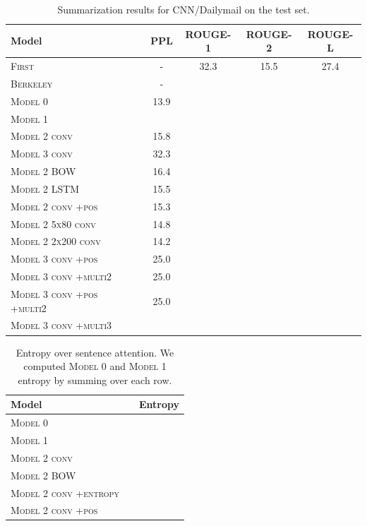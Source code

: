 \documentclass[12pt]{report}
\begin{document}
\begin{table}[h]
\centering
\begin{tabular}{llcccc}
 \toprule
 Model &  & PPL & ROUGE-1 & ROUGE-2 & ROUGE-L \\
 \midrule
\textsc{First} & & - & 32.3 & 15.5 & 27.4 \\
\textsc{Berkeley} & & - &  \\
\textsc{Model 0} & & 13.9 &  \\
 \textsc{Model 1} & & \\
\textsc{Model 2 conv} & & 15.8 & & \\
\textsc{Model 3 conv} & & 32.3 \\
\midrule
\textsc{Model 2 BOW} & & 16.4 & & \\
\textsc{Model 2 LSTM} & & 15.5 \\
\textsc{Model 2 conv +pos} & & 15.3 & & \\
\midrule
\textsc{Model 2 5x80 conv} & & 14.8 \\
\textsc{Model 2 2x200 conv} & & 14.2  \\
\midrule
\textsc{Model 3 conv +pos} & & 25.0 \\
\textsc{Model 3 conv +multi2} & & 25.0 \\
\textsc{Model 3 conv +pos +multi2} & & 25.0 \\
\textsc{Model 3 conv +multi3} & &  \\
 \bottomrule
\end{tabular}
\caption{Summarization results for CNN/Dailymail on the test set.}
\label{table:summary}
\end{table}

\begin{table}[h]
\centering
\begin{tabular}{llr}
\toprule
Model & & Entropy \\
\midrule
\textsc{Model 0} \\
\textsc{Model 1} \\
\textsc{Model 2 conv} \\
\textsc{Model 2 BOW} \\
\textsc{Model 2 conv +entropy}  \\
\textsc{Model 2 conv +pos} \\
\bottomrule
\end{tabular}
\caption{Entropy over sentence attention. We computed \textsc{Model 0} and \textsc{Model 1} entropy by summing over each row.}
\label{table:entropy}
\end{table}
\end{document}

